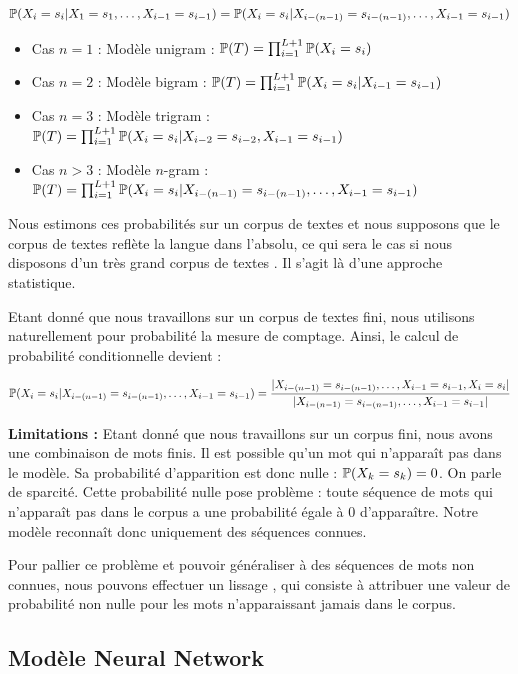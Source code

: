 \[ \P(X_i=s_i \vert X_1=s_1,\ldots, X_{i-1}=s_{i-1}) = \P(X_i=s_i \vert X_{i-(n-1)}=s_{i-(n-1)},\ldots, X_{i-1}=s_{i-1}) \]

\vspace{0.4cm}

\begin{itemize}
  \item Cas $n=1$ : Modèle unigram : $\P(T) = \prod_{i=1}^{L+1} \P(X_i = s_i)$
  \item Cas $n=2$ : Modèle bigram : $\P(T) = \prod_{i=1}^{L+1} \P(X_i = s_i\vert X_{i-1} = s_{i-1})$
  \item Cas $n=3$ : Modèle trigram : $\P(T) = \prod_{i=1}^{L+1} \P(X_i = s_i\vert X_{i-2} = s_{i-2}, X_{i-1} = s_{i-1})$
  \item Cas $n > 3$ : Modèle $n$-gram : $\P(T) = \prod_{i=1}^{L+1} \P(X_i = s_i\vert X_{i-(n-1)} = s_{i-(n-1)}, \ldots, X_{i-1} = s_{i-1})$
\end{itemize}

Nous estimons ces probabilités sur un corpus de textes et nous supposons que le corpus de textes reflète la langue dans l'absolu, 
ce qui sera le cas si nous disposons d'un très grand corpus de textes . Il s'agit là d'une approche statistique.

Etant donné que nous travaillons sur un corpus de textes fini, nous utilisons naturellement pour probabilité la mesure de comptage. Ainsi, le calcul de probabilité conditionnelle devient :

\[ \P(X_i = s_i\vert X_{i-(n-1)} = s_{i-(n-1)}, \ldots, X_{i-1} = s_{i-1}) = \frac{\vert X_{i-(n-1)} = s_{i-(n-1)}, \ldots, X_{i-1} = s_{i-1}, X_i = s_i\vert}{\vert X_{i-(n-1)} = s_{i-(n-1)},\ldots, X_{i-1} = s_{i-1}\vert} \]

\textbf{Limitations :} Etant donné que nous travaillons sur un corpus fini, nous avons une combinaison de mots finis. Il est possible qu'un mot qui n'apparaît pas dans le modèle. Sa probabilité d'apparition est donc nulle : $\P(X_k = s_k) = 0$. On parle de sparcité. Cette probabilité nulle pose problème : toute séquence de mots qui n'apparaît pas dans le corpus a une probabilité égale à 0 d'apparaître.
Notre modèle reconnaît donc uniquement des séquences connues.

Pour pallier ce problème et pouvoir généraliser à des séquences de mots non connues, nous pouvons effectuer un \og lissage \fg{}, qui consiste à attribuer une valeur de probabilité non nulle pour les mots n'apparaissant jamais dans le corpus.

\subsection{Modèle Neural Network}

